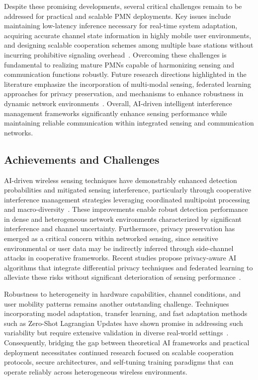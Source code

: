 \documentclass[sigconf]{acmart}
\begin{document}
Despite these promising developments, several critical challenges remain to be addressed for practical and scalable PMN deployments. Key issues include maintaining low-latency inference necessary for real-time system adaptation, acquiring accurate channel state information in highly mobile user environments, and designing scalable cooperation schemes among multiple base stations without incurring prohibitive signaling overhead~\cite{ref48}. Overcoming these challenges is fundamental to realizing mature PMNs capable of harmonizing sensing and communication functions robustly. Future research directions highlighted in the literature emphasize the incorporation of multi-modal sensing, federated learning approaches for privacy preservation, and mechanisms to enhance robustness in dynamic network environments~\cite{ref48}. Overall, AI-driven intelligent interference management frameworks significantly enhance sensing performance while maintaining reliable communication within integrated sensing and communication networks.

\subsection{Achievements and Challenges}

AI-driven wireless sensing techniques have demonstrably enhanced detection probabilities and mitigated sensing interference, particularly through cooperative interference management strategies leveraging coordinated multipoint processing and macro-diversity~\cite{ref41,ref42,ref48}. These improvements enable robust detection performance in dense and heterogeneous network environments characterized by significant interference and channel uncertainty. Furthermore, privacy preservation has emerged as a critical concern within networked sensing, since sensitive environmental or user data may be indirectly inferred through side-channel attacks in cooperative frameworks. Recent studies propose privacy-aware AI algorithms that integrate differential privacy techniques and federated learning to alleviate these risks without significant deterioration of sensing performance~\cite{ref43,ref48}.

Robustness to heterogeneity in hardware capabilities, channel conditions, and user mobility patterns remains another outstanding challenge. Techniques incorporating model adaptation, transfer learning, and fast adaptation methods such as Zero-Shot Lagrangian Updates have shown promise in addressing such variability but require extensive validation in diverse real-world settings~\cite{ref44,ref45}. Consequently, bridging the gap between theoretical AI frameworks and practical deployment necessitates continued research focused on scalable cooperation protocols, secure architectures, and self-tuning training paradigms that can operate reliably across heterogeneous wireless environments.
\end{document}
